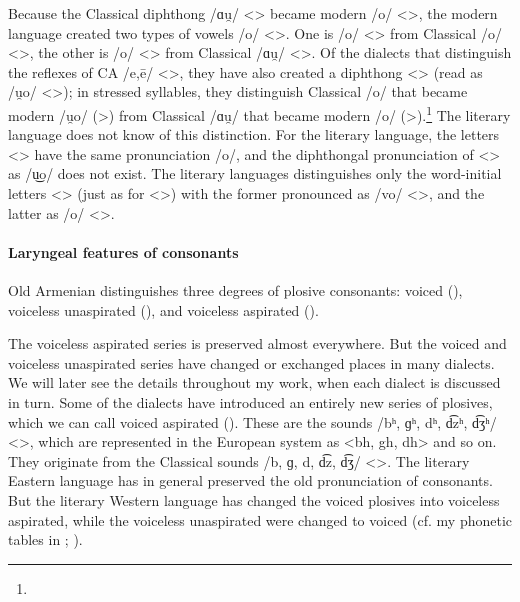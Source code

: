 Because the Classical diphthong /ɑu̯/ <> became modern /o/ <>, the modern language created two types of vowels /o/ <>. One is /o/ <> from Classical /o/ <>, the other is /o/ <> from Classical /ɑu̯/ <>. Of the dialects that distinguish the reflexes of CA /e,ē/ <>, they have also created a diphthong <> (read as /u̯o/ <>); in stressed syllables, they distinguish Classical /o/ that became modern /u̯o/ (>) from Classical /ɑu̯/ that became modern /o/ (>).\footnote{} The literary language does not know of this distinction. For the literary language, the letters <> have the same pronunciation /o/, and the diphthongal pronunciation of <> as /u͜o/ does not exist. The literary languages distinguishes only the word-initial letters <> (just as for <>) with the former pronounced as /vo/ <>, and the latter as /o/ <>. 




\begin{adjarianpage}\label{page:17}\end{adjarianpage}%

\paragraph{Laryngeal features of consonants}
Old Armenian distinguishes three degrees of plosive consonants: voiced (), voiceless unaspirated (), and voiceless aspirated (). 

 The voiceless aspirated series is preserved almost everywhere. But the voiced and voiceless unaspirated series have changed or exchanged places in many dialects. We will later see the details throughout my work, when each dialect is discussed in turn. Some of the dialects have introduced an entirely new series of plosives, which we can call voiced aspirated (). These are the sounds /bʰ, ɡʰ, dʰ, d͡zʰ, d͡ʒʰ/ <>, which are represented in the European system as <bh, gh, dh> and so on. They originate from the Classical sounds /b, ɡ, d, d͡z, d͡ʒ/ <>. The literary Eastern language has in general preserved the old pronunciation of consonants. But the literary Western language has changed the voiced plosives into voiceless aspirated, while the voiceless unaspirated were changed to voiced (cf. my phonetic tables in \citealt{Adjarian-1899-ArmenianExplosives}; ). 

